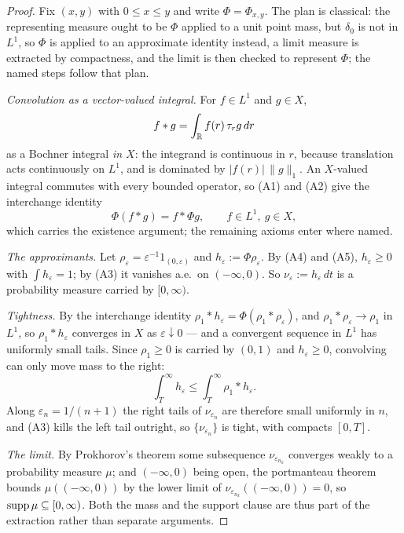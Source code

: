 \begin{proof}
\leanok
Fix $(x,y)$ with $0 \le x \le y$ and write $\Phi = \Phi_{x,y}$. The plan is classical:
the representing measure ought to be $\Phi$ applied to a unit point mass, but $\delta_0$
is not in $L^1$, so $\Phi$ is applied to an approximate identity instead, a limit measure
is extracted by compactness, and the limit is then checked to represent $\Phi$; the named
steps follow that plan.

\emph{Convolution as a vector-valued integral.} For $f \in L^1$ and $g \in X$,
\[
  f * g = \int_{\mathbb{R}} f(r)\,\tau_r g\,dr
\]
as a Bochner integral \emph{in $X$}: the integrand is continuous in $r$, because translation
acts continuously on $L^1$, and is dominated by $|f(r)|\,\|g\|_1$. An $X$-valued integral
commutes with every bounded operator, so (A1) and (A2) give the interchange identity
\[
  \Phi(f * g) = f * \Phi g, \qquad f \in L^1,\ g \in X,
\]
which carries the existence argument; the remaining axioms enter where named.

\emph{The approximants.} Let $\rho_\varepsilon = \varepsilon^{-1} 1_{(0,\varepsilon)}$ and
$h_\varepsilon := \Phi \rho_\varepsilon$. By (A4) and (A5), $h_\varepsilon \ge 0$ with
$\int h_\varepsilon = 1$; by (A3) it vanishes a.e.\ on $(-\infty,0)$. So
$\nu_\varepsilon := h_\varepsilon\,dt$ is a probability measure carried by $[0,\infty)$.

\emph{Tightness.} By the interchange identity
$\rho_1 * h_\varepsilon = \Phi(\rho_1 * \rho_\varepsilon)$, and
$\rho_1 * \rho_\varepsilon \to \rho_1$ in $L^1$, so $\rho_1 * h_\varepsilon$ converges in $X$
as $\varepsilon \downarrow 0$ --- and a convergent sequence in $L^1$ has uniformly small tails.
Since $\rho_1 \ge 0$ is carried by $(0,1)$ and $h_\varepsilon \ge 0$, convolving can only move
mass to the right:
\[
  \int_T^\infty h_\varepsilon \le \int_T^\infty \rho_1 * h_\varepsilon .
\]
Along $\varepsilon_n = 1/(n+1)$ the right tails of $\nu_{\varepsilon_n}$ are therefore small
uniformly in $n$, and (A3) kills the left tail outright, so
$\{\nu_{\varepsilon_n}\}$ is tight, with compacts $[0,T]$.

\emph{The limit.} By Prokhorov's theorem some subsequence $\nu_{\varepsilon_{n_k}}$ converges
weakly to a probability measure $\mu$; and $(-\infty,0)$ being open, the portmanteau theorem
bounds $\mu((-\infty,0))$ by the lower limit of $\nu_{\varepsilon_{n_k}}((-\infty,0)) = 0$, so
$\operatorname{supp} \mu \subseteq [0,\infty)$. Both the mass and the support clause are thus part of the
extraction rather than separate arguments.


\end{proof}

